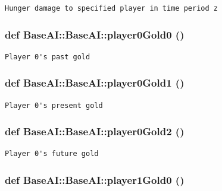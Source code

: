 \footnotesize\begin{verbatim}Hunger damage to specified player in time period z
\end{verbatim}
\normalsize
 \hypertarget{classBaseAI_1_1BaseAI_65c8f75088ac56f1eca6021bf4354059}{
\subsubsection[{player0Gold0}]{\setlength{\rightskip}{0pt plus 5cm}def BaseAI::BaseAI::player0Gold0 ()}}
\label{classBaseAI_1_1BaseAI_65c8f75088ac56f1eca6021bf4354059}




\footnotesize\begin{verbatim}Player 0's past gold
\end{verbatim}
\normalsize
 \hypertarget{classBaseAI_1_1BaseAI_a94399280c90f9b944a3f8c53f46d187}{
\subsubsection[{player0Gold1}]{\setlength{\rightskip}{0pt plus 5cm}def BaseAI::BaseAI::player0Gold1 ()}}
\label{classBaseAI_1_1BaseAI_a94399280c90f9b944a3f8c53f46d187}




\footnotesize\begin{verbatim}Player 0's present gold
\end{verbatim}
\normalsize
 \hypertarget{classBaseAI_1_1BaseAI_bc66afa5fd654c32639a40a4574d245e}{
\subsubsection[{player0Gold2}]{\setlength{\rightskip}{0pt plus 5cm}def BaseAI::BaseAI::player0Gold2 ()}}
\label{classBaseAI_1_1BaseAI_bc66afa5fd654c32639a40a4574d245e}




\footnotesize\begin{verbatim}Player 0's future gold
\end{verbatim}
\normalsize
 \hypertarget{classBaseAI_1_1BaseAI_011f11f02555a0df44af4de27b0647b0}{
\subsubsection[{player1Gold0}]{\setlength{\rightskip}{0pt plus 5cm}def BaseAI::BaseAI::player1Gold0 ()}}
\label{classBaseAI_1_1BaseAI_011f11f02555a0df44af4de27b0647b0}





